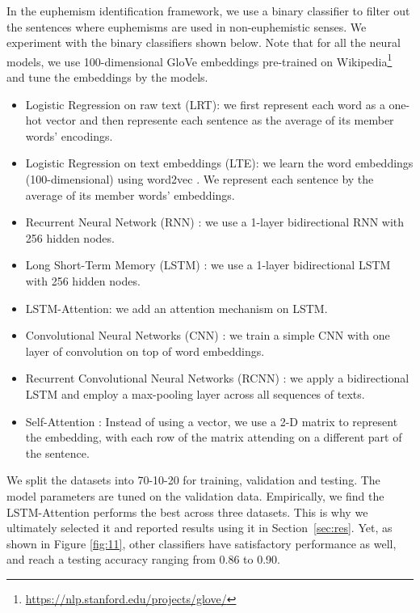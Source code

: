 In the euphemism identification framework, we use a binary classifier to filter out the sentences where euphemisms are used in non-euphemistic senses. 
We experiment with the binary classifiers shown below. Note that for all the neural models, we use 100-dimensional GloVe embeddings \cite{pennington2014glove} pre-trained on Wikipedia\footnote{\url{https://nlp.stanford.edu/projects/glove/}} and tune the embeddings by the models. 
\begin{itemize}
	\item Logistic Regression \cite{hosmer2013applied} on raw text (LRT): we first represent each word as a one-hot vector and then represente each sentence as the average of its member words' encodings. 
	\item Logistic Regression on text embeddings (LTE): we learn the word embeddings (100-dimensional) using word2vec \cite{mikolov2013distributed,mikolov2013efficient}. 
	We represent each sentence by the average of its member words' embeddings. 
	\item Recurrent Neural Network (RNN) \cite{rumelhart1985learning}: we use a 1-layer bidirectional RNN with 256 hidden nodes. 
	\item Long Short-Term Memory (LSTM) \cite{hochreiter1997long}: we use a 1-layer bidirectional LSTM with 256 hidden nodes. 
	\item LSTM-Attention: we add an attention mechanism \cite{bahdanau2015neural} on LSTM. 
	\item Convolutional Neural Networks (CNN) \cite{kim2014convolutional}: we train a simple CNN with one layer of convolution on top of word embeddings. 
	\item Recurrent Convolutional Neural Networks (RCNN) \cite{lai2015recurrent}: we apply a bidirectional LSTM and employ a max-pooling layer across all sequences of texts. 
	\item Self-Attention \cite{lin2017structured}: Instead of using a vector, we use a 2-D matrix to represent the embedding, with each row of the matrix attending on a different part of the sentence. 
\end{itemize}


We split the datasets into 70-10-20 for training, validation and testing. 
The model parameters are tuned on the validation data. 
Empirically, we find the LSTM-Attention performs the best across three datasets. This is  why we ultimately selected it and reported results using it in Section~\ref{sec:res}. 
Yet, as shown in Figure \ref{fig:11}, other classifiers have satisfactory performance as well, and reach a testing accuracy ranging from 0.86 to 0.90. 

